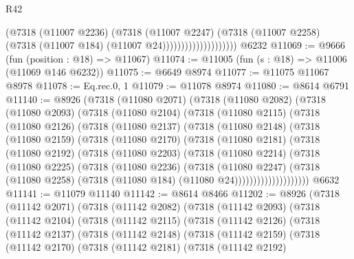 \begin{lexlean}{R42}
\begin{coremodule}
{                                  (@7318
                                    (@11007 @2236)
                                    (@7318
                                      (@11007 @2247)
                                      (@7318
                                        (@11007 @2258)
                                        (@7318 (@11007 @184) (@11007 @24))))))))))))))))))))
    @6232
@11069 := @9666 (fun (position : @18) => @11067)
@11074 := @11005 (fun (s : @18) => @11006 (@11069 @146 @6232))
@11075 := @6649 @8974
@11077 := @11075 @11067 @8978
@11078 := Eq.rec.{0, 1}
@11079 := @11078 @8974
@11080 := @8614 @6791
@11140 := @8926
    (@7318
      (@11080 @2071)
      (@7318
        (@11080 @2082)
        (@7318
          (@11080 @2093)
          (@7318
            (@11080 @2104)
            (@7318
              (@11080 @2115)
              (@7318
                (@11080 @2126)
                (@7318
                  (@11080 @2137)
                  (@7318
                    (@11080 @2148)
                    (@7318
                      (@11080 @2159)
                      (@7318
                        (@11080 @2170)
                        (@7318
                          (@11080 @2181)
                          (@7318
                            (@11080 @2192)
                            (@7318
                              (@11080 @2203)
                              (@7318
                                (@11080 @2214)
                                (@7318
                                  (@11080 @2225)
                                  (@7318
                                    (@11080 @2236)
                                    (@7318
                                      (@11080 @2247)
                                      (@7318
                                        (@11080 @2258)
                                        (@7318 (@11080 @184) (@11080 @24))))))))))))))))))))
    @6632
@11141 := @11079 @11140
@11142 := @8614 @8466
@11202 := @8926
    (@7318
      (@11142 @2071)
      (@7318
        (@11142 @2082)
        (@7318
          (@11142 @2093)
          (@7318
            (@11142 @2104)
            (@7318
              (@11142 @2115)
              (@7318
                (@11142 @2126)
                (@7318
                  (@11142 @2137)
                  (@7318
                    (@11142 @2148)
                    (@7318
                      (@11142 @2159)
                      (@7318
                        (@11142 @2170)
                        (@7318
                          (@11142 @2181)
                          (@7318
                            (@11142 @2192)
}
\end{coremodule}
\end{lexlean}
